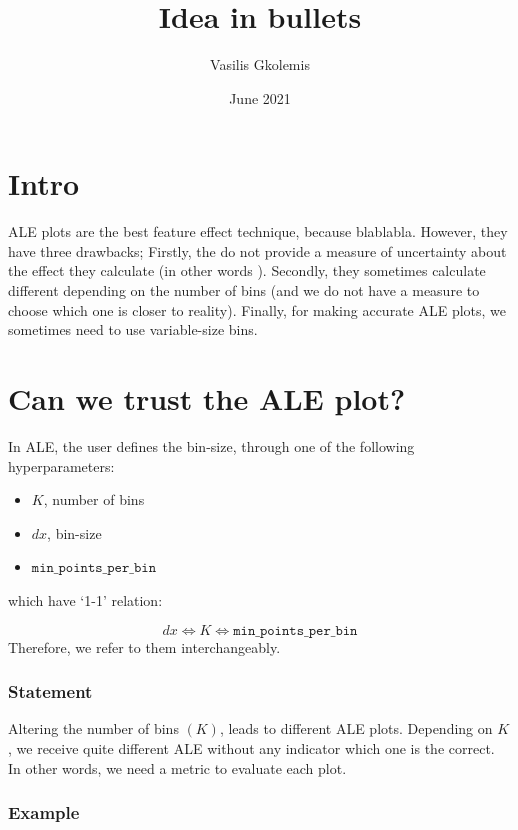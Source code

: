 \documentclass{article}
\title{Idea in bullets}
\author{Vasilis Gkolemis}
\date{June 2021}
\begin{document}
\maketitle


\section{Intro}

ALE plots are the best feature effect technique, because
blablabla. However, they have three drawbacks; Firstly, the do not
provide a measure of uncertainty about the effect they calculate (in
other words ). Secondly, they sometimes calculate different depending
on the number of bins (and we do not have a measure to choose which
one is closer to reality). Finally, for making accurate ALE plots, we
sometimes need to use variable-size bins.


\section{Can we trust the ALE plot?}

In ALE, the user defines the bin-size, through one of the following
hyperparameters:

\begin{itemize}
\item \(K\), number of bins
\item \(dx\), bin-size
\item \(\texttt{min\_points\_per\_bin}\)
\end{itemize}
%
which have `1-1' relation:

\begin{equation*}
 dx \Leftrightarrow K \Leftrightarrow \texttt{min\_points\_per\_bin}
\end{equation*}
%
Therefore, we refer to them interchangeably.


\subsubsection*{Statement}

Altering the number of bins \( (K) \), leads to different ALE
plots. Depending on \(K\), we receive quite different ALE without any
indicator which one is the correct. In other words, we need a metric
to evaluate each plot.

\subsubsection*{Example}
\end{document}

